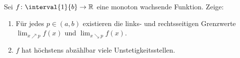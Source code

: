 \begin{prob}
  Sei $f \colon \interval{1}{b} \to \mathbb{R}$ eine monoton wachsende Funktion.
  Zeige:
  \begin{enumerate}[label=(\alph*)]
  \item Für jedes $p \in (a,b)$ existieren die links- und rechtsseitigen
    Grenzwerte $\lim_{x \nearrow p} f(x)$ und $\lim_{x \searrow p} f(x)$.
  \item $f$ hat höchstens abzählbar viele Unstetigkeitsstellen.
  \end{enumerate}
\end{prob}
